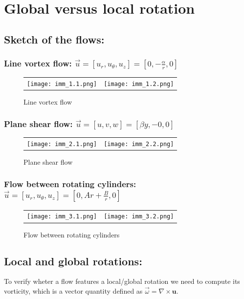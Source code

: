 \documentclass{article}
\begin{document}
\section{Global versus local rotation}

\subsection{Sketch of the flows:}
\subsubsection{Line vortex flow: \textnormal{$\vec{u} = [u_r, u_\theta, u_z] = \left[0, -\frac{\alpha}{r}, 0\right]$ }}
\begin{figure}[h]
    \centering
    \begin{tabular}{cc}
        \texttt{[image: imm\_1.1.png]} &
        \texttt{[image: imm\_1.2.png]}
    \end{tabular}
    \caption{Line vortex flow}
    \label{fig:mie_immagini}
\end{figure}
\subsubsection{Plane shear flow: \textnormal{$\vec{u} = [u, v, w] = \left[\beta y, -0, 0\right]$}} 
\begin{figure}[h]
    \centering
    \begin{tabular}{cc}
        \texttt{[image: imm\_2.1.png]} &
        \texttt{[image: imm\_2.2.png]}
    \end{tabular}
    \caption{Plane shear flow}
    \label{fig:mie_immagini}
\end{figure}
\subsubsection{Flow between rotating cylinders: \textnormal{$\vec{u} = [u_r, u_\theta, u_z] = \left[0, Ar + \frac{B}{r}, 0\right]$}} 
\begin{figure}[h]
    \centering
    \begin{tabular}{cc}
        \texttt{[image: imm\_3.1.png]} &
        \texttt{[image: imm\_3.2.png]}
    \end{tabular}
    \caption{Flow between rotating cylinders}
    \label{fig:mie_immagini}
\end{figure}


\subsection{Local and global rotations:}
To verify wheter a flow features a local/global rotation we need to compute its vorticity, which is a vector quantity defined as $\vec{\omega} = \nabla \times \mathbf{u}$.
\end{document}
